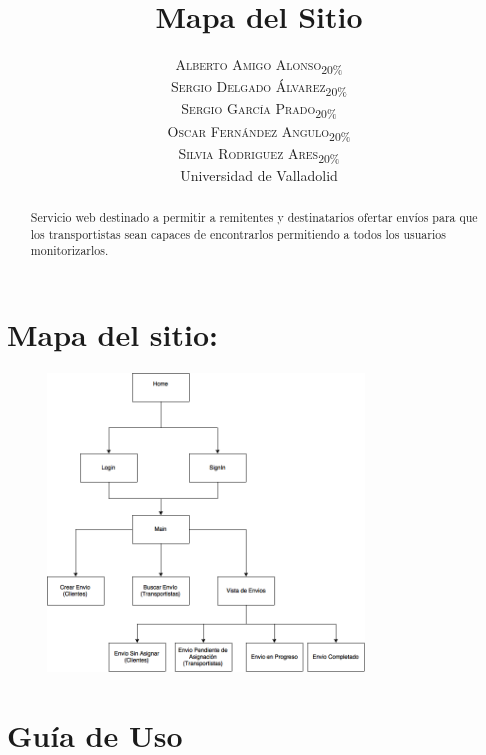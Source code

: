 \documentclass[10pt, a4paper,spanish]{article}
\title{\vspace{-15mm}\fontsize{24pt}{10pt}\selectfont\textbf{Mapa del Sitio}} %
\author{
\large
\textsc{Alberto Amigo Alonso\textsubscript{20\%}}\\[2mm] %
\textsc{Sergio Delgado Álvarez\textsubscript{20\%}}\\[2mm] %
\textsc{Sergio García Prado\textsubscript{20\%}}\\[2mm] %
\textsc{Oscar Fernández Angulo\textsubscript{20\%}}\\[2mm] %
\textsc{Silvia Rodriguez Ares\textsubscript{20\%}}\\[2mm] %
\normalsize Universidad de Valladolid \\ %
\vspace{-5mm}
}
\date{}
\begin{document}
	\maketitle %

	\thispagestyle{fancy} %


	\begin{abstract}
		\noindent Servicio web destinado a permitir a remitentes y destinatarios ofertar envíos para que los transportistas sean capaces de encontrarlos permitiendo a todos los usuarios monitorizarlos.
	\end{abstract}

	\section{Mapa del sitio:}


		\begin{figure}[H]
			\centering
				\includegraphics[width=0.75\textwidth]{sitemap.png}
		\end{figure}

	\section{Guía de Uso}
\end{document}
